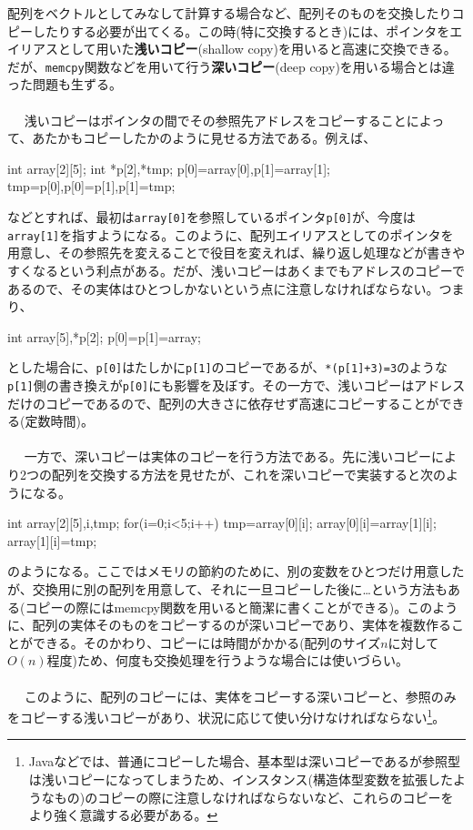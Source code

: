 配列をベクトルとしてみなして計算する場合など、配列そのものを交換したりコピーしたりする必要が出てくる。この時(特に交換するとき)には、ポインタをエイリアスとして用いた\textbf{浅いコピー}(shallow copy)を用いると高速に交換できる。だが、\verb|memcpy|関数などを用いて行う\textbf{深いコピー}(deep copy)を用いる場合とは違った問題も生ずる。
\\ \\　
浅いコピーはポインタの間でその参照先アドレスをコピーすることによって、あたかもコピーしたかのように見せる方法である。例えば、
\begin{code}
int array[2][5];
int *p[2],*tmp;
p[0]=array[0],p[1]=array[1];
tmp=p[0],p[0]=p[1],p[1]=tmp;
\end{code}
などとすれば、最初は\verb|array[0]|を参照しているポインタ\verb|p[0]|が、今度は\verb|array[1]|を指すようになる。このように、配列エイリアスとしてのポインタを用意し、その参照先を変えることで役目を変えれば、繰り返し処理などが書きやすくなるという利点がある。だが、浅いコピーはあくまでもアドレスのコピーであるので、その実体はひとつしかないという点に注意しなければならない。つまり、
\begin{code}
int array[5],*p[2];
p[0]=p[1]=array;
\end{code}
とした場合に、\verb|p[0]|はたしかに\verb|p[1]|のコピーであるが、\verb|*(p[1]+3)=3|のような\verb|p[1]|側の書き換えが\verb|p[0]|にも影響を及ぼす。その一方で、浅いコピーはアドレスだけのコピーであるので、配列の大きさに依存せず高速にコピーすることができる(定数時間)。
\\ \\　
一方で、深いコピーは実体のコピーを行う方法である。先に浅いコピーにより2つの配列を交換する方法を見せたが、これを深いコピーで実装すると次のようになる。
\begin{code}
int array[2][5],i,tmp;
for(i=0;i<5;i++){
  tmp=array[0][i];
  array[0][i]=array[1][i];
  array[1][i]=tmp;
}
\end{code}
のようになる。ここではメモリの節約のために、別の変数をひとつだけ用意したが、交換用に別の配列を用意して、それに一旦コピーした後に…という方法もある(コピーの際にはmemcpy関数を用いると簡潔に書くことができる)。このように、配列の実体そのものをコピーするのが深いコピーであり、実体を複数作ることができる。そのかわり、コピーには時間がかかる(配列のサイズ$n$に対して$O(n)$程度)ため、何度も交換処理を行うような場合には使いづらい。
\\ \\　
このように、配列のコピーには、実体をコピーする深いコピーと、参照のみをコピーする浅いコピーがあり、状況に応じて使い分けなければならない\footnote{Javaなどでは、普通にコピーした場合、基本型は深いコピーであるが参照型は浅いコピーになってしまうため、インスタンス(構造体型変数を拡張したようなもの)のコピーの際に注意しなければならないなど、これらのコピーをより強く意識する必要がある。}。

